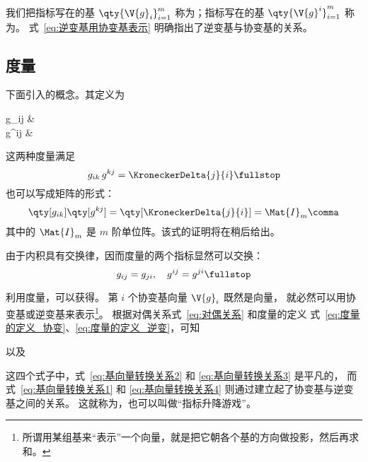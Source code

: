 我们把指标写在的基 $\qty{\V{g}_i}^m_{i=1}$
称为；指标写在的基
$\qty{\V{g}^i}^m_{i=1}$ 称为。
式~\eqref{eq:逆变基用协变基表示} 明确指出了逆变基与协变基的关系。

\subsection{度量} \label{subsec:度量}
下面引入的概念。其定义为
\begin{braceEq}
	g_{ij} & {} \comma 
	\label{eq:度量的定义_协变} \\
	g^{ij} & {} \fullstop
	\label{eq:度量的定义_逆变}
\end{braceEq}
这两种度量满足
\begin{equation}
	g_{ik}\,g^{kj} = \KroneckerDelta{j}{i} \fullstop
	\label{eq:度量之积}
\end{equation}
也可以写成矩阵的形式：
\begin{equation}
	\qty[g_{ik}]\qty[g^{kj}]
	=\qty[\KroneckerDelta{j}{i}]=\Mat{I}_m \comma
\end{equation}
其中的 $\Mat{I}_m$ 是 $m$ 阶单位阵。该式的证明将在稍后给出。

由于内积具有交换律，因而度量的两个指标显然可以交换：
\begin{equation}
	g_{ij}=g_{ji}, \quad g^{ij}=g^{ji} \fullstop
\end{equation}

利用度量，可以获得。
第 $i$ 个协变基向量 $\V{g}_i$ 既然是向量，
就必然可以用协变基或逆变基来表示\footnote{%
	所谓用某组基来“表示”一个向量，就是把它朝各个基的方向做投影，然后再求和。}。
根据对偶关系式~\eqref{eq:对偶关系} 和度量的定义
式~\eqref{eq:度量的定义_协变}、\eqref{eq:度量的定义_逆变}，可知
以及
这四个式子中，式~\eqref{eq:基向量转换关系2} 和
\eqref{eq:基向量转换关系3} 是平凡的，
而式~\eqref{eq:基向量转换关系1} 和 \eqref{eq:基向量转换关系4}
则通过建立起了协变基与逆变基之间的关系。
这就称为，也可以叫做“指标升降游戏”。

